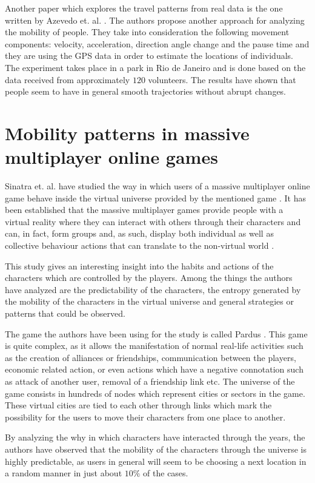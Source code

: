 Another paper which explores the travel patterns from real data is the one
written by Azevedo et. al. \cite{Azevedo09}. The authors propose another
approach for analyzing the mobility of people. They take into consideration the
following movement components: velocity, acceleration, direction angle change
and the pause time and they are using the GPS data in order to estimate the
locations of individuals. The experiment takes place in a park in Rio de Janeiro
and is done based on the data received from approximately $120$ volunteers. The
results have shown that people seem to have in general smooth trajectories without
abrupt changes.

\section{Mobility patterns in massive multiplayer online games}
Sinatra et. al. have studied the way in which users of a massive multiplayer
online game behave inside the virtual universe provided by the mentioned game
\cite{Sinatra14}. It has been established that the massive multiplayer games
provide people with a virtual reality where they can interact with others
through their characters and can, in fact, form groups and, as such, display
both individual as well as collective behaviour actions that can translate to
the non-virtual world \cite{Ball03}.

This study gives an interesting insight into the habits and actions of the
characters which are controlled by the players. Among the things the authors
have analyzed are the predictability of the characters, the entropy generated by
the mobility of the characters in the virtual universe and general strategies or
patterns that could be observed.

The game the authors have been using for the study is called Pardus
\cite{Pardus}. This game is quite complex, as it allows the manifestation of
normal real-life activities such as the creation of alliances or friendships,
communication between the players, economic related action, or even actions
which have a negative connotation such as attack of another user, removal of a
friendship link etc. The universe of the game consists in hundreds of nodes
which represent cities or sectors in the game. These virtual cities are tied to
each other through links which mark the possibility for the users to move their
characters from one place to another.

By analyzing the why in which characters have interacted through the years, the
authors have observed that the mobility of the characters through the universe
is highly predictable, as users in general will seem to be choosing a next
location in a random manner in just about $10\%$ of the cases.

